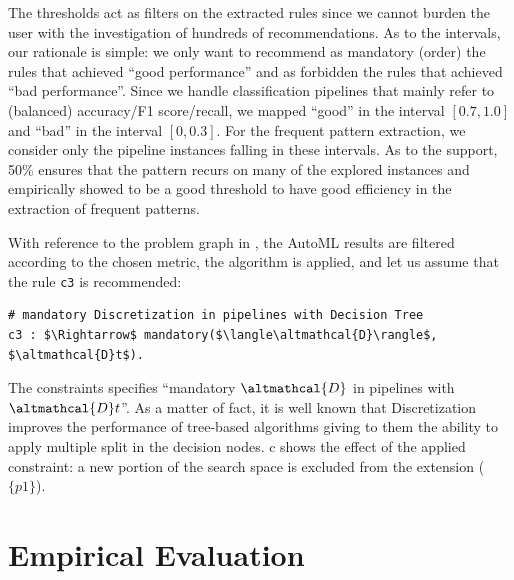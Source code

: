 The thresholds act as filters on the extracted rules since we cannot burden the user with the investigation of hundreds of recommendations. 
As to the intervals, our rationale is simple: we only want to recommend as mandatory (order) the rules that achieved ``good performance'' and as forbidden the rules that achieved ``bad performance''.
Since we handle classification pipelines that mainly refer to (balanced) accuracy/F1 score/recall, we mapped ``good'' in the interval $[0.7, 1.0]$ and ``bad'' in the interval $[0, 0.3]$. For the frequent pattern extraction, we consider only the pipeline instances falling in these intervals.
As to the support, 50\% ensures that the pattern recurs on many of the explored instances and empirically showed to be a good threshold to have good efficiency in the extraction of frequent patterns.

\begin{example}
With reference to the problem graph in ,
the AutoML results are filtered according to the chosen metric, the algorithm \cite{raschkas_2018_mlxtend} is applied, and let us assume that the rule \texttt{c3} is recommended:
\begin{lstlisting}[mathescape=true]
# mandatory Discretization in pipelines with Decision Tree
c3 : $\Rightarrow$ mandatory($\langle\altmathcal{D}\rangle$, $\altmathcal{D}t$).
\end{lstlisting}
The constraints specifies ``mandatory $\altmathcal{D}$ in pipelines with $\altmathcal{D}t$''.
As a matter of fact, it is well known that Discretization improves the performance of tree-based algorithms giving to them the ability to apply multiple split in the decision nodes.
c shows the effect of the applied constraint: a new portion of the search space is excluded from the extension ($\{p1\}$).
\end{example}


\section{Empirical Evaluation}\label{hamlet-sec:test}

